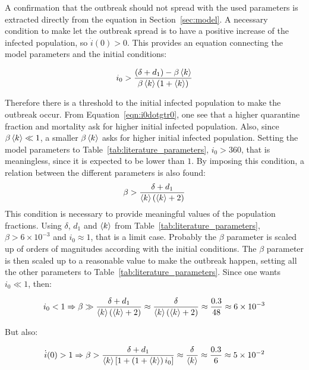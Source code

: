 A confirmation that the outbreak should not spread with the used parameters is extracted directly from the equation in Section~\ref{sec:model}. A necessary condition to make let the outbreak spread is to have a positive increase of the infected population, so $\dot{i}(0)>0$. This provides an equation connecting the model parameters and the initial conditions:

\begin{equation}
i_0 > \frac{\left(\delta+d_1\right)-\beta\braket{k}}{\beta\braket{k}(1+\braket{k})}
\label{eqn:i0dotgtr0}
\end{equation}

Therefore there is a threshold to the initial infected population to make the outbreak occur. From Equation~\ref{eqn:i0dotgtr0}, one see that a higher quarantine fraction and mortality ask for higher initial infected population. Also, since $\beta\braket{k}\ll1$, a smaller $\beta\braket{k}$ asks for higher initial infected population. Setting the model parameters to Table~\ref{tab:literature_parameters}, $i_0>360$, that is meaningless, since it is expected to be lower than $1$. By imposing this condition, a relation between the different parameters is also found: 
\begin{equation}
\beta > \frac{\delta + d_1}{\braket{k}(\braket{k}+2)}
\label{eqn:i0low1}
\end{equation}
This condition is necessary to provide meaningful values of the population fractions. Using $\delta$, $d_1$ and $\braket{k}$ from Table~\ref{tab:literature_parameters}, $\beta>6\times10^{-3}$ and $i_0\approx1$, that is a limit case. Probably the $\beta$ parameter is scaled up of orders of magnitudes according with the initial conditions. The $\beta$ parameter is then scaled up to a reasonable value to make the outbreak happen, setting all the other parameters to Table~\ref{tab:literature_parameters}. Since one wants $i_0\ll1$, then:

\begin{equation}
i_0<1 \Rightarrow \beta\gg \frac{\delta + d_1}{\braket{k}(\braket{k}+2)} \approx \frac{\delta}{\braket{k}(\braket{k}+2)} \approx \frac{0.3}{48} \approx 6\times10^{-3}
\label{eqn:numerical_i0low1}
\end{equation}

But also: 

\begin{equation}
\dot{i}(0)>1 \Rightarrow \beta > \frac{\delta + d_1}{\braket{k}\left[1+\left(1+\braket{k}\right)i_0\right]} \approx \frac{\delta}{\braket{k}} \approx \frac{0.3}{6} \approx 5\times10^{-2}
\label{eqn:numerical_i0dotgtr1}
\end{equation}

